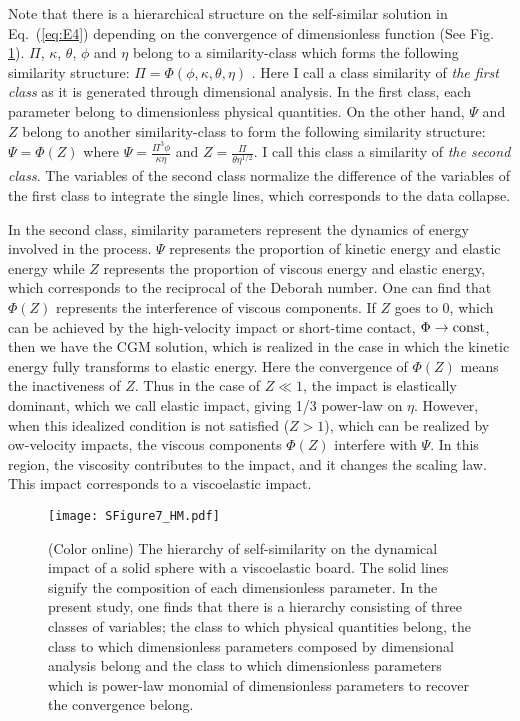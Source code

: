 \documentclass[default,iicol,10pt]{sn-jnl}%
\theoremstyle{thmstyleone}%
\theoremstyle{thmstyletwo}%
\theoremstyle{thmstylethree}%
\begin{document}
Note that there is a hierarchical structure on the self-similar solution in Eq.~(\ref{eq:E4}) depending on the convergence of dimensionless function (See Fig. \ref{fig:FS1b}). $\Pi$, $\kappa$, $\theta$, $\phi$ and $\eta$ belong to a similarity-class which forms the following similarity structure: $\Pi = \Phi ( \phi, \kappa, \theta, \eta)$ . Here I call a class similarity of {\it the first class} as it is generated through dimensional analysis. In the first class, each parameter belong to dimensionless physical quantities. On the other hand, $\Psi$ and $Z$ belong to another similarity-class to form the following similarity structure: $\Psi = \Phi \left( Z \right)$ where $\Psi = \frac{ \Pi^3 \phi }{\kappa \eta}$ and  $Z = \frac{ \Pi}{ \theta \eta^{1/2}}$. I call this class a similarity of {\it the second class}\cite{class}. The variables of the second class normalize the difference of the variables of the first class to integrate the single lines, which corresponds to the data collapse\cite{Bhattacharjee,Nakazato2018}. 

In the second class, similarity parameters represent the dynamics of energy involved in the process. $\Psi$ represents the proportion of kinetic energy and elastic energy while $Z$ represents the proportion of viscous energy and elastic energy, which corresponds to the reciprocal of the Deborah number. One can find that $\Phi(Z)$ represents the interference of viscous components. If $Z$ goes to 0, which can be achieved by the high-velocity impact or short-time contact, $\Phi \rightarrow {\rm const} $, then we have the CGM solution, which is realized in the case in which the kinetic energy fully transforms to elastic energy. Here the convergence of $\Phi(Z)$ means the inactiveness of $Z$. Thus in the case of $Z \ll 1$, the impact is elastically dominant, which we call elastic impact, giving 1/3 power-law on $\eta$. However, when this idealized condition is not satisfied ($Z >1$), which can be realized by ow-velocity impacts, the viscous components $\Phi(Z)$ interfere with $\Psi$. In this region, the viscosity contributes to the impact, and it changes the scaling law. This impact corresponds to a viscoelastic impact.
%
\begin{figure}[h!]
  \texttt{[image: SFigure7\_HM.pdf]}
  \caption{(Color online) The hierarchy of self-similarity on the dynamical impact of a solid sphere with a viscoelastic board. The solid lines signify the composition of each dimensionless parameter. In the present study, one finds that there is a hierarchy consisting of three classes of variables; the class to which physical quantities belong, the class to which dimensionless parameters composed by dimensional analysis belong and the class to which dimensionless parameters which is power-law monomial of dimensionless parameters to recover the convergence belong.  \label{fig:FS1b}}
\end{figure}
\end{document}
